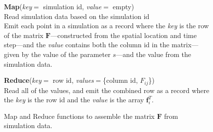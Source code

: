 \documentclass[final]{siamltex}
\providecommand{\mat}[1]{\boldsymbol{#1}}
\providecommand{\mF}{\ensuremath{\mat{F}}}
\providecommand{\vf}{\ensuremath{{\mathbf{{f}}}}}
\begin{document}
\begin{figure}
\begin{minipage}[t]{0.48\linewidth} \footnotesize
\textbf{Map}(\emph{key}$=$ simulation id, \emph{value}$=$ empty)\\
[1ex] Read simulation data based on the simulation id \\ 
Emit each point in a simulation as a record where the \emph{key} is the row of
the matrix $\mF$---constructed from the spatial location and time step---and 
the \emph{value} contains both the column id
in the matrix---given by the value of the parameter $s$---and the
value from the simulation data. \end{minipage}\hfill\begin{minipage}[t]{0.48\linewidth} \footnotesize
\textbf{Reduce}(\emph{key}$=$ row id, \emph{values}$= $\{column id, $F_{ij}$\})\\[1ex]
Read all of the values, and emit the combined row as a record where the \emph{key} is the row id and the \emph{value} is the array $\vf_i^T$. 
\end{minipage}
\caption{Map and Reduce functions to assemble the matrix $\mF$ from simulation data.}
\label{fig:mr-assemble}
\end{figure}
\end{document}
